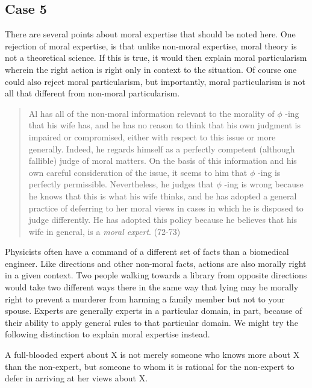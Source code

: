 \documentclass[phdthesis,12pt,final]{wuthesis}
\theoremstyle{definition}
\theoremstyle{definition}
\theoremstyle{definition}
\theoremstyle{definition}
\theoremstyle{remark}
\begin{document}
\subsection*{Case 5}\label{case-5}

There are several points about moral expertise that should be noted here. One rejection of moral expertise, is that unlike non-moral expertise, moral theory is not a theoretical science. If this is true, it would then explain moral particularism wherein the right action is right only in context to the situation. Of course one could also reject moral particularism, but importantly, moral particularism is not all that different from non-moral particularism.

\begin{quote}
Al has all of the non-moral information relevant to the morality of \(\phi\) -ing that his wife has, and he has no reason to think that his own judgment is impaired or compromised, either with respect to this issue or more generally. Indeed, he regards himself as a perfectly competent (although fallible) judge of moral matters. On the basis of this information and his own careful consideration of the issue, it seems to him that \(\phi\) -ing is perfectly permissible. Nevertheless, he judges that \(\phi\) -ing is wrong because he knows that this is what his wife thinks, and he has adopted a general practice of deferring to her moral views in cases in which he is disposed to judge differently. He has adopted this policy because he believes that his wife in general, is a \emph{moral expert}. (72-73)
\end{quote}

Physicists often have a command of a different set of facts than a biomedical engineer. Like directions and other non-moral facts, actions are also morally right in a given context. Two people walking towards a library from opposite directions would take two different ways there in the same way that lying may be morally right to prevent a murderer from harming a family member but not to your spouse. Experts are generally experts in a particular domain, in part, because of their ability to apply general rules to that particular domain. We might try the following distinction to explain moral expertise instead.

A full-blooded expert about X is not merely someone who knows more about X than the non-expert, but someone to whom it is rational for the non-expert to defer in arriving at her views about X.
\end{document}
